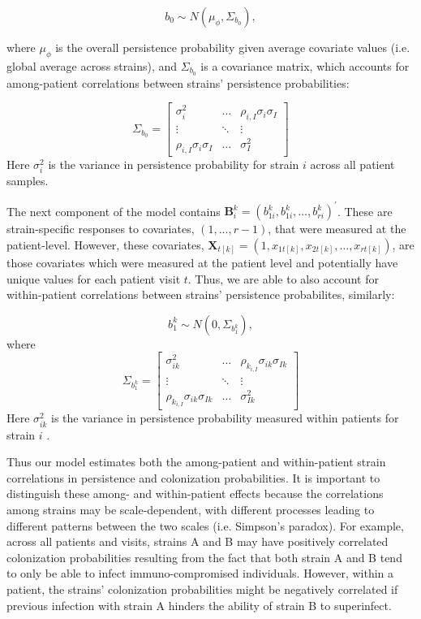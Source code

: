 \documentclass{article}
\begin{document}
$$ b_0 \sim N(\mu_{\phi}, \Sigma_{b_{0}}), $$

where $\mu_{\phi}$ is the overall persistence probability given average covariate values (i.e. global average across strains), and $\Sigma_{b_{0}}$ is a covariance matrix, which accounts for among-patient correlations between strains' persistence probabilities:

$$ \Sigma_{b_{0}} = \left[
                \begin{array}{ccc}
                \sigma_{i}^2 & \dots & \rho_{i,I}\sigma_{i}\sigma_{I} \\
                \vdots & \ddots & \vdots \\
                \rho_{i,I}\sigma_{i}\sigma_{I} & \dots & \sigma_{I}^2
                \end{array}
                \right]
$$
Here $\sigma_{i}^2$ is the variance in persistence probability for strain $i$ across all patient samples. 

The next component of the model contains $ \textbf{B}^{k}_{i} = (b^k_{1i}, b^k_{1i}, \dots, b^k_{ri})^{'} $. These are strain-specific responses to covariates, $(1,...,r-1)$, that were measured at the patient-level. However, these covariates, $ \textbf{X}_{t[k]} = (1, x_{1t[k]}, x_{2t[k]}, \dots, x_{rt[k]}) $, are those covariates which were measured at the patient level and potentially have unique values for each patient visit $t$. Thus, we are able to also account for within-patient correlations between strains' persistence probabilites, similarly:

$$ b^k_1 \sim N(0, \Sigma_{b^k_{1}}), $$
where
$$ \Sigma_{b^k_{1}} = \left[
                \begin{array}{ccc}
                \sigma_{ik}^2 & \dots & \rho_{k_{i,I}}\sigma_{ik}\sigma_{Ik} \\
                \vdots & \ddots & \vdots \\
                \rho_{k_{i,I}}\sigma_{ik}\sigma_{Ik} & \dots & \sigma_{Ik}^2
                \end{array}
                \right]
$$
Here $\sigma_{ik}^2$ is the variance in persistence probability measured within patients for strain $i$ . 

Thus our model estimates both the among-patient and within-patient strain correlations in persistence and colonization probabilities. It is important to distinguish these among- and within-patient effects because the correlations among strains may be scale-dependent, with different processes leading to different patterns between the two scales (i.e. Simpson's paradox). For example, across all patients and visits, strains A and B may have positively correlated colonization probabilities resulting from the fact that both strain A and B tend to only be able to infect immuno-compromised individuals. However, within a patient, the strains' colonization probabilities might be negatively correlated if previous infection with strain A hinders the ability of strain B to superinfect. 
\end{document}
